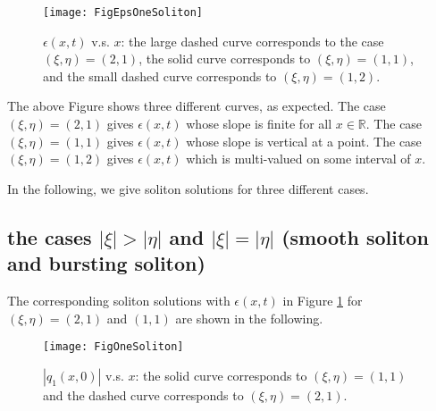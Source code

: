 \documentclass[11pt]{article}
\newcommand{\RR}{{\mathbb R}}
\begin{document}
\begin{figure}[htbp] %
   \centering
   \texttt{[image: FigEpsOneSoliton]} 
   \caption{$\epsilon(x,t) $ v.s. $x$: the large dashed curve corresponds to the case $(\xi,\eta)=(2,1)$, the solid curve corresponds to $(\xi,\eta)=(1,1)$, and the small dashed curve corresponds to $(\xi,\eta)=(1,2)$.}
   \label{fig1}
\end{figure}

The above Figure shows three different curves, as expected. The case $(\xi,\eta)=(2,1)$ gives $\epsilon(x,t)$ whose slope is finite for all $x\in \RR$. The case $(\xi,\eta)=(1,1)$ gives $\epsilon(x,t)$ whose slope is vertical at a point. The case $(\xi,\eta)=(1,2)$ gives $\epsilon(x,t)$ which is multi-valued on some interval of $x$.

 In the following, we give soliton solutions for three different cases. 
\newpage
\subsection{the cases $|\xi|>|\eta|$ and $|\xi|=|\eta|$ (smooth soliton and bursting soliton)} 
\label{smooth-bursting}

The corresponding soliton solutions with $\epsilon(x,t)$ in Figure \ref{fig1} for $(\xi,\eta)=(2,1)$ and $(1,1)$ are shown in the following.

\begin{figure}[htbp] %
   \centering
   \texttt{[image: FigOneSoliton]} 
   \caption{$|q_1(x,0)| $ v.s. $x$: the solid curve corresponds to $(\xi,\eta)=(1,1)$ and the dashed curve corresponds to  $(\xi,\eta)=(2,1)$.}
   \label{fig2}
\end{figure}
\end{document}
